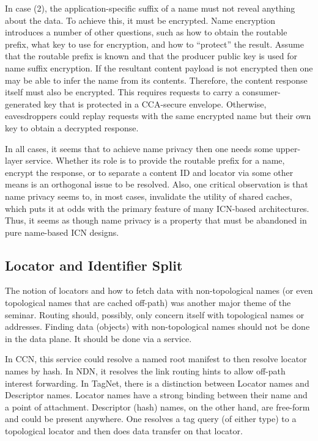 In case (2), the application-specific suffix of a name must not reveal anything about
the data. To achieve this, it must be encrypted. Name encryption introduces a number
of other questions, such as how to obtain the routable prefix, what key to use for
encryption, and how to ``protect'' the result. Assume that the routable prefix is
known and that the producer public key is used for name suffix encryption. If the
resultant content payload is not encrypted then one may be able to infer the name
from its contents. Therefore, the content response itself must also be encrypted.
This requires requests to carry a consumer-generated key that is protected in a
CCA-secure envelope. Otherwise, eavesdroppers could replay requests with the same
encrypted name but their own key to obtain a decrypted response.

In all cases, it seems that to achieve name privacy then one needs some upper-layer
service. Whether its role is to provide the routable prefix for a name, encrypt the
response, or to separate a content ID and locator via some other means is an orthogonal
issue to be resolved. Also, one critical observation is that name privacy seems to, in most cases, invalidate the utility of
shared caches, which puts it at odds with the primary feature of many ICN-based
architectures. Thus, it seems as though name privacy is a property that must be
abandoned in pure name-based ICN designs.


\subsection{Locator and Identifier Split}
The notion of locators and how to fetch data with non-topological names (or
even topological names that are cached off-path) was another major theme of
the seminar. Routing should, possibly, only concern
itself with topological names or addresses. Finding data (objects) with non-topological
names should not be done in the data plane. It should be done via a service.

In CCN, this service could resolve a named root manifest to then resolve locator names by hash.
In NDN, it resolves the link routing hints to allow off-path interest forwarding. In TagNet,
there is a distinction between Locator names and Descriptor names. Locator names have a
strong binding between their name and a point of attachment. Descriptor (hash) names, on the
other hand, are free-form and could be present anywhere.  One resolves a tag query (of either
type) to a topological locator and then does data transfer on that locator.

